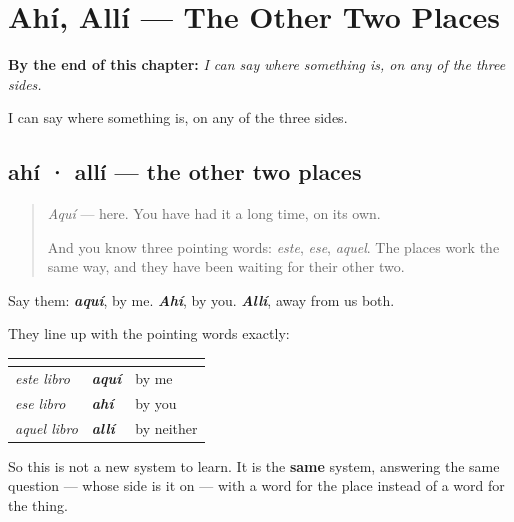 
\chapter{Ahí, Allí --- The Other Two Places}
\label{ch:ahi-alli}

\begin{chapteropening}
\textbf{By the end of this chapter:} \emph{I can say where something is, on any of the three sides.}

I can say where something is, on any of the three sides.
\end{chapteropening}

\section[ahí · allí]{ahí · allí — the other two places}

\label{lesson:ES-C65-ahi-alli}



\begin{quote}
\emph{Aquí} — here. You have had it a long time, on its own.

And you know three pointing words: \emph{este}, \emph{ese}, \emph{aquel}. The places work the same way, and they have been waiting for their other two.
\end{quote}

\begin{grammarlens}[title={Grammar Lens: one for one}]
Say them: \emph{\textbf{aquí}}, by me. \emph{\textbf{Ahí}}, by you. \emph{\textbf{Allí}}, away from us both.

They line up with the pointing words exactly:

\noindent
\begin{tabularx}{\linewidth}{@{}>{\raggedright\arraybackslash}X>{\raggedright\arraybackslash}X>{\raggedright\arraybackslash}X@{}}
\toprule
\textbf{} & \textbf{} & \textbf{} \\
\midrule
\emph{este libro} & \emph{\textbf{aquí}} & by me \\
\emph{ese libro} & \emph{\textbf{ahí}} & by you \\
\emph{aquel libro} & \emph{\textbf{allí}} & by neither \\
\bottomrule
\end{tabularx}

So this is not a new system to learn. It is the \textbf{same} system, answering the same question — whose side is it on — with a word for the place instead of a word for the thing.
\end{grammarlens}

